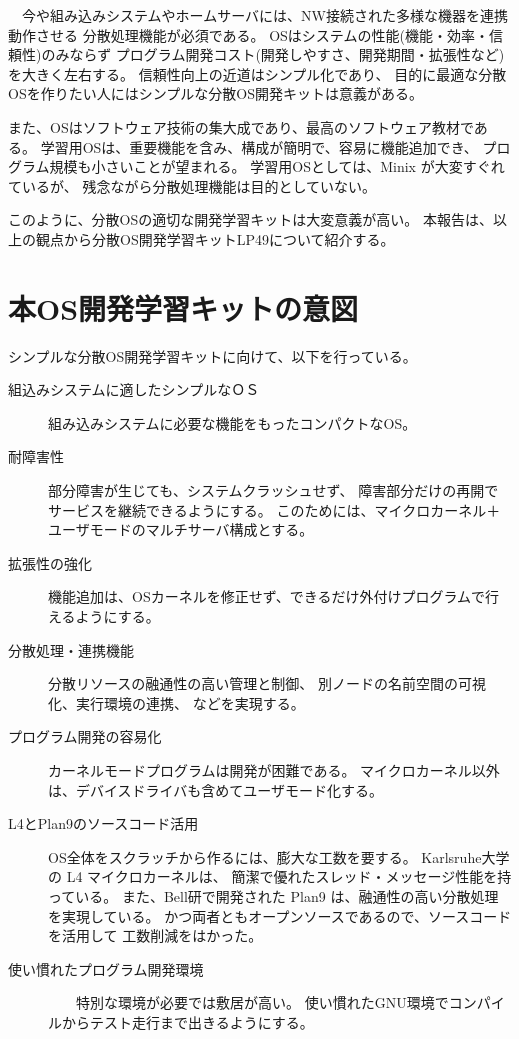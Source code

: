 \documentclass[draft]{ipsjpapers}
\begin{document}
　今や組み込みシステムやホームサーバには、NW接続された多様な機器を連携動作させる
分散処理機能が必須である。
OSはシステムの性能(機能・効率・信頼性)のみならず
プログラム開発コスト(開発しやすさ、開発期間・拡張性など)を大きく左右する。
信頼性向上の近道はシンプル化であり、
目的に最適な分散OSを作りたい人にはシンプルな分散OS開発キットは意義がある。

  また、OSはソフトウェア技術の集大成であり、最高のソフトウェア教材である。
学習用OSは、重要機能を含み、構成が簡明で、容易に機能追加でき、
プログラム規模も小さいことが望まれる。
学習用OSとしては、Minix が大変すぐれているが、
残念ながら分散処理機能は目的としていない。

このように、分散OSの適切な開発学習キットは大変意義が高い。
本報告は、以上の観点から分散OS開発学習キットLP49について紹介する。



\section{本OS開発学習キットの意図}\label{sec:Enum}\label{sec:item}

シンプルな分散OS開発学習キットに向けて、以下を行っている。

\begin{description}

\item[組込みシステムに適したシンプルなＯＳ]
    組み込みシステムに必要な機能をもったコンパクトなOS。
    
\item[耐障害性]
    部分障害が生じても、システムクラッシュせず、
    障害部分だけの再開でサービスを継続できるようにする。
    このためには、マイクロカーネル＋ユーザモードのマルチサーバ構成とする。
    
\item[拡張性の強化]
    機能追加は、OSカーネルを修正せず、できるだけ外付けプログラムで行えるようにする。
    
\item[分散処理・連携機能]
      分散リソースの融通性の高い管理と制御、
      別ノードの名前空間の可視化、実行環境の連携、
      などを実現する。
    
\item[プログラム開発の容易化]
    カーネルモードプログラムは開発が困難である。
    マイクロカーネル以外は、デバイスドライバも含めてユーザモード化する。
    
\item[L4とPlan9のソースコード活用]  
     OS全体をスクラッチから作るには、膨大な工数を要する。
    Karlsruhe大学の L4 マイクロカーネルは、 
    簡潔で優れたスレッド・メッセージ性能を持っている。
    また、Bell研で開発された Plan9 は、融通性の高い分散処理を実現している。
    かつ両者ともオープンソースであるので、ソースコードを活用して
    工数削減をはかった。
    
\item[使い慣れたプログラム開発環境]
　　特別な環境が必要では敷居が高い。
    使い慣れたGNU環境でコンパイルからテスト走行まで出きるようにする。

\end{description}    
\end{document}
